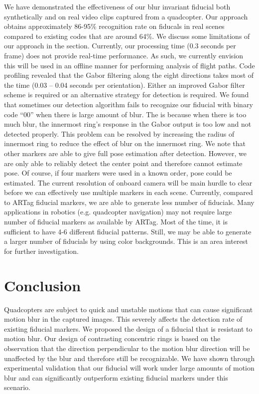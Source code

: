 \documentclass[10pt,twocolumn,letterpaper]{article}
\begin{document}
We have demonstrated the effectiveness of our blur invariant fiducial both
synthetically and on real video clips captured from a quadcopter.   Our approach obtains
approximately 86-95\% recognition rate on fiducals in real scenes compared to existing codes
that are around 64\%.  We discuss some limitations of our approach in the
section.
Currently, our processing time (0.3 seconds per frame) does not provide
real-time performance.  As such, we currently envision this will be used in an
offline manner for performing analysis of flight paths. Code profiling revealed that the Gabor filtering along the eight
directions takes most of the time (0.03 -- 0.04 seconds per orientation).  Either an
improved Gabor filter scheme is required or an alternative strategy for
detection is required.
We found that sometimes our detection
algorithm fails to recognize our fiducial with binary code ``00'' when there is
large amount of blur.  The is because when there is too much blur, the innermost
ring's response in the Gabor output is too low and not detected properly.
This problem can be resolved by increasing the radius of innermost ring to
reduce the effect of blur on the innermost ring. 
We note that other markers are able to give
full pose estimation after detection.  However, we are only able to reliably detect
the center point and therefore cannot estimate pose.  Of course, if four
markers were used in a known order, pose could be estimated. The current
resolution of onboard camera will be main hurdle to clear before we can
effectively use multiple markers in each scene.
Currently, compared to ARTag fiducial markers, we are able to generate less
number of fiducials. Many applications in robotics (e.g. quadcopter navigation)
may not require large number of fiducial markers as available by ARTag.  Most
of the time, it is sufficient to have 4-6 different fiducial patterns. Still,
we may be able to generate a larger number of fiducials by using color
backgrounds. This is an area interest for further investigation.

\section{Conclusion}

Quadcopters are subject to quick and unstable motions that can cause significant
motion blur in the captured images. This severely affects the detection rate of
existing fiducial markers. We proposed the design of a fiducial that is
resistant to motion blur. Our design of contrasting concentric rings is based on the
observation that the direction perpendicular to the motion blur direction will
be unaffected by the blur and therefore still be recognizable. We have shown
through experimental validation that our fiducial will work under large
amounts of motion blur and can significantly outperform existing fiducial
markers under this scenario.

{\small


}
\end{document}
